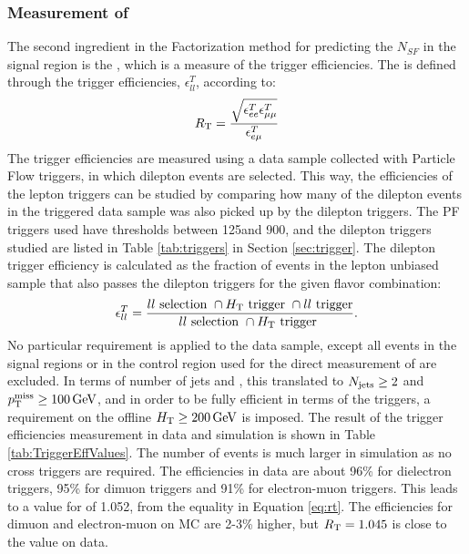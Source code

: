 \subsubsection*{Measurement of \RT}\label{sec:rt}
\noindent
\justify
The second ingredient in the Factorization method for predicting the $N_{SF}$ in the signal region is the \RT, which is a measure of the trigger efficiencies. 
The \RT is defined through the trigger efficiencies, $\epsilon_{ll}^{T}$,  according to:
\begin{equation}
\label{eq:masterformulaExp}
    R_{\text{T}} = \frac{\sqrt{\epsilon^{T}_{ee}\epsilon^{T}_{\mu\mu}}}{\epsilon^{T}_{e\mu}}
\end{equation}                                               
The trigger efficiencies are measured using a data sample collected with Particle Flow \HT triggers, in which dilepton events are selected. 
This way, the efficiencies of the lepton triggers can be studied by comparing how many of the dilepton events in the \HT triggered data sample was also picked up by the dilepton triggers. 
The PF \HT triggers used have thresholds between 125\GeV and 900\GeV, and the dilepton triggers studied are listed in Table \ref{tab:triggers} in Section \ref{sec:trigger}. 
The dilepton trigger efficiency is calculated as the fraction of events in the lepton unbiased sample that also passes the dilepton triggers for the given flavor combination: 
\begin{equation}
\epsilon_{ll}^{T} =\frac{ll\text{ selection }\cap H_{\mathrm{T}} \text{ trigger } \cap ll\text{ trigger}  }{ ll\text{ selection }\cap H_{\mathrm{T}} \text{ trigger }} .
\label{eq:rt}
\end{equation} 
No particular requirement is applied to the data sample, except all events in the signal regions or in the \ttbar control region used for the direct measurement of \Rsfof are excluded. 
In terms of number of jets and \ptmiss, this translated to $N_{\mathrm{jets}}\geq2$ and $p_{\mathrm{T}}^\text{miss}\geq100\,\text{Ge\hspace{-.08em}V}$, and in order to be fully efficient in terms of the \HT triggers, a requirement on the offline $H_{\mathrm{T}}\geq200\,\text{Ge\hspace{-.08em}V}$ is imposed.  
The result of the trigger efficiencies measurement in data and simulation is shown in Table \ref{tab:TriggerEffValues}. 
The number of events is much larger in simulation as no \HT cross triggers are required.
The efficiencies in data are about 96\% for dielectron triggers, 95\% for dimuon triggers and 91\% for electron-muon triggers. 
This leads to a value for \RT of 1.052, from the equality in Equation \ref{eq:rt}. 
The efficiencies for dimuon and electron-muon on MC are 2-3\% higher, but $R_{\text{T}}=1.045$ is close to the value on data.

